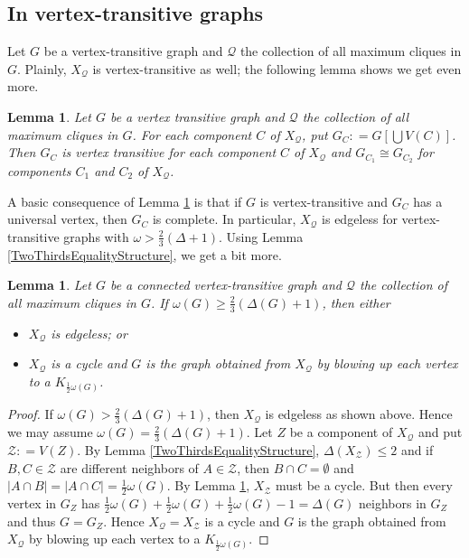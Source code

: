 \documentclass[12pt]{article}
\theoremstyle{plain}
\newtheorem{lem}[thm]{Lemma}
\theoremstyle{definition}
\theoremstyle{remark}
\newcommand{\fancy}[1]{\mathcal{#1}}
\newcommand{\card}[1]{\left|#1\right|}
\newcommand{\parens}[1]{\left( #1 \right)}
\newcommand{\brackets}[1]{\left[ #1 \right]}
\newcommand{\DefinedAs}{\mathrel{\mathop:}=}
\def\Q{\fancy{Q}}
\def\Z{\fancy{Z}}
\begin{document}
\subsection{In vertex-transitive graphs}
Let $G$ be a vertex-transitive graph and $\Q$ the collection of all maximum cliques in $G$.  Plainly, $X_\Q$ is vertex-transitive as well; the following lemma shows we get even more.

\begin{lem}\label{transitiveClustering}
Let $G$ be a vertex transitive graph and $\Q$ the collection of all maximum cliques in $G$.  For each component $C$ of $X_\Q$, put $G_C \DefinedAs G\brackets{\bigcup V(C)}$.  Then $G_C$ is vertex transitive for
each component $C$ of $X_\Q$ and $G_{C_1} \cong G_{C_2}$ for components $C_1$ and $C_2$ of $X_\Q$.
\end{lem}

A basic consequence of Lemma \ref{transitiveClustering} is that if $G$ is vertex-transitive and $G_C$ has a universal vertex, then $G_C$ is complete.  In particular, $X_\Q$ is edgeless for vertex-transitive graphs with $\omega > \frac23 (\Delta + 1)$.   Using Lemma \ref{TwoThirdsEqualityStructure}, we get a bit more.

\begin{lem}\label{TransitiveClusteringBigCliques}
Let $G$ be a connected vertex-transitive graph and $\Q$ the collection of all maximum cliques in $G$.  If $\omega(G) \ge \frac23 \parens{\Delta(G) + 1}$, then either
\begin{itemize}
\item $X_\Q$ is edgeless; or
\item $X_\Q$ is a cycle and $G$ is the graph obtained from $X_\Q$ by blowing up each vertex to a $K_{\frac12 \omega(G)}$.
\end{itemize}
\end{lem}
\begin{proof}
If $\omega(G) > \frac23 \parens{\Delta(G) + 1}$, then $X_\Q$ is edgeless as shown above.  Hence we may assume $\omega(G) = \frac23 \parens{\Delta(G) + 1}$.  Let $Z$ be a component of $X_\Q$ and put $\Z \DefinedAs V(Z)$.
By Lemma \ref{TwoThirdsEqualityStructure}, $\Delta(X_\Z) \le 2$ and if $B, C \in \Z$ are different neighbors of $A \in \Z$, then $B \cap C = \emptyset$ and $\card{A \cap B} = \card{A \cap C} = \frac12 \omega(G)$.  By Lemma \ref{transitiveClustering}, $X_\Z$ must be a cycle.  But then every vertex in $G_Z$ has $\frac12 \omega(G) + \frac12 \omega(G) + \frac12 \omega(G) - 1 = \Delta(G)$ neighbors in $G_Z$ and thus $G = G_Z$.  Hence $X_\Q = X_\Z$ is a cycle and $G$ is the graph obtained from $X_\Q$ by blowing up each vertex to a $K_{\frac12 \omega(G)}$.
\end{proof}
\end{document}
